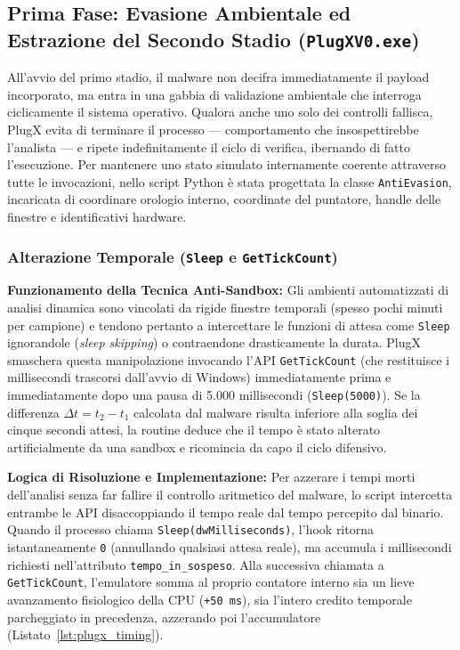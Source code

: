 \documentclass[11pt, a4paper]{article}
\begin{document}
\subsection{Prima Fase: Evasione Ambientale ed Estrazione del Secondo Stadio (\texttt{PlugXV0.exe})}

All'avvio del primo stadio, il malware non decifra immediatamente il payload incorporato, ma entra in una gabbia di validazione ambientale che interroga ciclicamente il sistema operativo. Qualora anche uno solo dei controlli fallisca, PlugX evita di terminare il processo --- comportamento che insospettirebbe l'analista --- e ripete indefinitamente il ciclo di verifica, ibernando di fatto l'esecuzione. Per mantenere uno stato simulato internamente coerente attraverso tutte le invocazioni, nello script Python \`e stata progettata la classe \texttt{AntiEvasion}, incaricata di coordinare orologio interno, coordinate del puntatore, handle delle finestre e identificativi hardware.

\subsubsection{Alterazione Temporale (\texttt{Sleep} e \texttt{GetTickCount})}

\textbf{Funzionamento della Tecnica Anti-Sandbox:} Gli ambienti automatizzati di analisi dinamica sono vincolati da rigide finestre temporali (spesso pochi minuti per campione) e tendono pertanto a intercettare le funzioni di attesa come \texttt{Sleep} ignorandole (\textit{sleep skipping}) o contraendone drasticamente la durata. PlugX smaschera questa manipolazione invocando l'API \texttt{GetTickCount} (che restituisce i millisecondi trascorsi dall'avvio di Windows) immediatamente prima e immediatamente dopo una pausa di 5.000 millisecondi (\texttt{Sleep(5000)}). Se la differenza $\Delta t = t_2 - t_1$ calcolata dal malware risulta inferiore alla soglia dei cinque secondi attesi, la routine deduce che il tempo \`e stato alterato artificialmente da una sandbox e ricomincia da capo il ciclo difensivo.

\textbf{Logica di Risoluzione e Implementazione:} Per azzerare i tempi morti dell'analisi senza far fallire il controllo aritmetico del malware, lo script intercetta entrambe le API disaccoppiando il tempo reale dal tempo percepito dal binario. Quando il processo chiama \texttt{Sleep(dw\allowbreak{}Milliseconds)}, l'hook ritorna istantaneamente \texttt{0} (annullando qualsiasi attesa reale), ma accumula i millisecondi richiesti nell'attributo \texttt{tempo\_\allowbreak{}in\_\allowbreak{}sospeso}. Alla successiva chiamata a \texttt{GetTickCount}, l'emulatore somma al proprio contatore interno sia un lieve avanzamento fisiologico della CPU (\texttt{+50 ms}), sia l'intero credito temporale parcheggiato in precedenza, azzerando poi l'accumulatore (Listato~\ref{lst:plugx_timing}).
\end{document}
